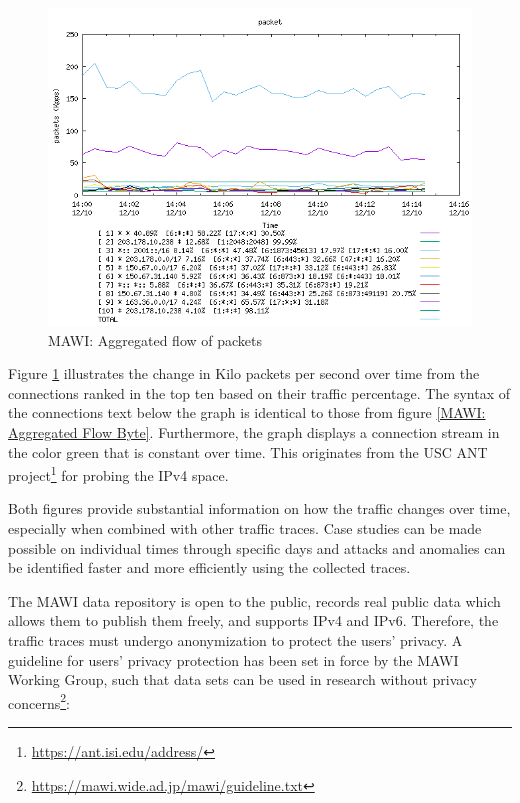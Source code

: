 \documentclass[sigconf,authorversion,nonacm]{acmart}
\begin{document}
\begin{figure}
        \centering
        \includegraphics[width=1\linewidth]{MAWI 2023-12-10 aggregated analysis packet.png}
        \caption{MAWI: Aggregated flow of packets}
        \label{MAWI: Aggregated Flow Packet}
\end{figure}

Figure \ref{MAWI: Aggregated Flow Packet} illustrates the change in Kilo packets per second over time from the connections ranked in the top ten based on their traffic percentage. The syntax of the connections text below the graph is identical to those from figure \ref{MAWI: Aggregated Flow Byte}. Furthermore, the graph displays a connection stream in the color green that is constant over time. This originates from the USC ANT project\footnote{\url{https://ant.isi.edu/address/}} for probing the IPv4 space.

Both figures provide substantial information on how the traffic changes over time, especially when combined with other traffic traces. Case studies can be made possible on individual times through specific days and attacks and anomalies can be identified faster and more efficiently using the collected traces.

The MAWI data repository is open to the public, records real public data which allows them to publish them freely, and supports IPv4 and IPv6. Therefore, the traffic traces must undergo anonymization to protect the users' privacy. A guideline for users' privacy protection has been set in force by the MAWI Working Group, such that data sets can be used in research without privacy concerns\footnote{\url{https://mawi.wide.ad.jp/mawi/guideline.txt}}:
\end{document}
